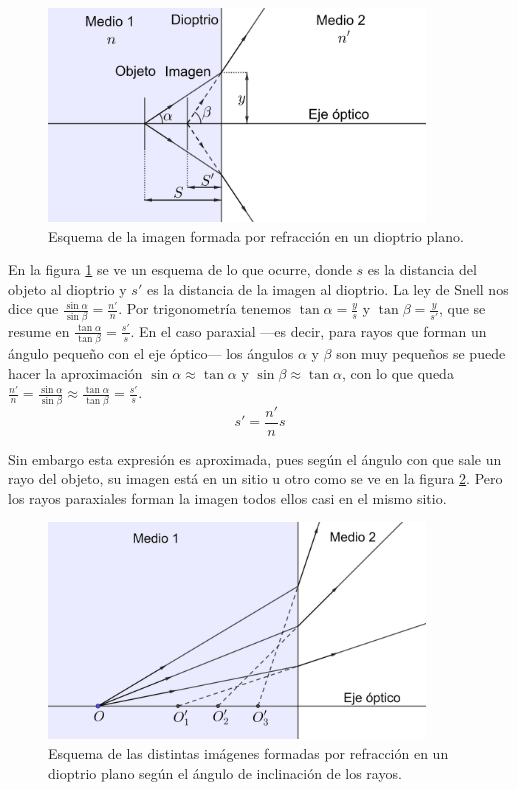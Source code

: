 \documentclass[12pt]{article}
\numberwithin{table}{section}
\numberwithin{figure}{section}
\numberwithin{equation}{section}
\DeclareMathOperator{\sen}{sin}
\begin{document}
\begin{figure}[!ht]
	\small \centering \sffamily
	\begin{center}
		\includegraphics[width=10cm]{P2Refraccion.png}
		\caption{Esquema de la imagen formada por refracción en un dioptrio plano.}
		\label{P2refraccion}
	\end{center}
\end{figure}

En la figura \ref{P2refraccion} se ve un esquema de lo que ocurre, donde $s$ es la distancia del objeto al dioptrio y $s'$ es la distancia de la imagen al dioptrio. La ley de Snell nos dice que $\frac{\sen\alpha}{\sen\beta}=\frac{n'}{n}$. Por trigonometría tenemos $\tan\alpha=\frac{y}{s}$ y $\tan\beta=\frac{y}{s'}$, que se resume en $\frac{\tan\alpha}{\tan\beta}=\frac{s'}{s}$. En el caso paraxial ---es decir, para rayos que forman un ángulo pequeño con el eje óptico--- los ángulos $\alpha$ y $\beta$ son muy pequeños se puede hacer la aproximación $\sen\alpha\approx\tan\alpha$ y $\sen\beta\approx\tan\alpha$, con lo que queda $\frac{n'}{n}=\frac{\sen\alpha}{\sen\beta}\approx\frac{\tan\alpha}{\tan\beta}=\frac{s'}{s}$.
\begin{equation}\label{P2distimagen}
	s'=\frac{n'}{n}s
\end{equation} 

Sin embargo esta expresión es aproximada, pues según el ángulo con que sale un rayo del objeto, su imagen está en un sitio u otro como se ve en la figura \ref{P2astigmatismo}. Pero los rayos paraxiales forman la imagen todos ellos casi en el mismo sitio.

\begin{figure}[!ht]
	\small \centering \sffamily
	\begin{center}
		\includegraphics[width=10cm]{P2Astigmatismo.png}
		\caption{Esquema de las distintas imágenes formadas por refracción en un dioptrio plano según el ángulo de inclinación de los rayos.}
		\label{P2astigmatismo}
	\end{center}
\end{figure}
\end{document}
